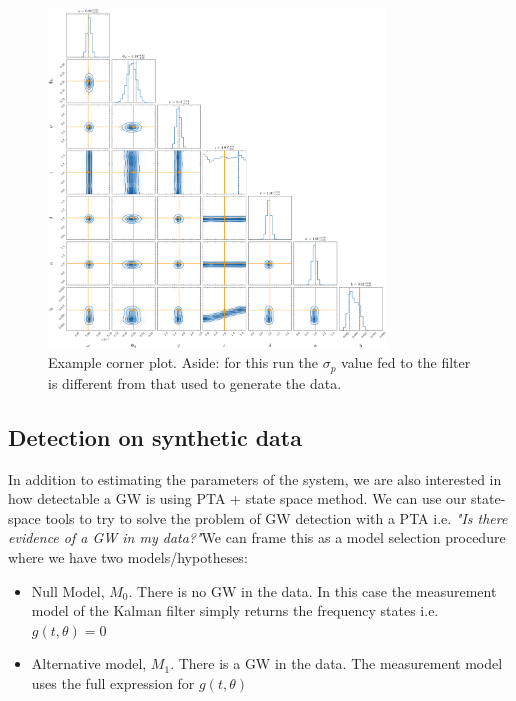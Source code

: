 \documentclass[fleqn,usenatbib,useAMS]{mnras}
\begin{document}
\begin{figure}
	\includegraphics[width=0.8\textwidth]{images/canonical_example}
	\caption{Example corner plot. Aside: for this run the $\sigma_p$ value fed to the filter is different from that used to generate the data.}
	\label{fig:corner2}
\end{figure}

\subsection{Detection on synthetic data}\label{sec:detection}

In addition to estimating the parameters of the system, we are also interested in how detectable a GW is using PTA + state space method. We can use our state-space tools  to try to solve the problem of GW detection with a PTA i.e. \textit{"Is there evidence of a GW in my data?"}We can frame this as a model selection procedure where we have two models/hypotheses:

\begin{itemize}
\item Null Model, $M_0$. There is no GW in the data. In this case the measurement model of the Kalman filter simply returns the frequency states i.e. $g(t,\theta)= 0$
\item Alternative model, $M_1$. There is a GW in the data. The measurement model uses the full expression for $g(t,\theta)$
\end{itemize}
\end{document}
